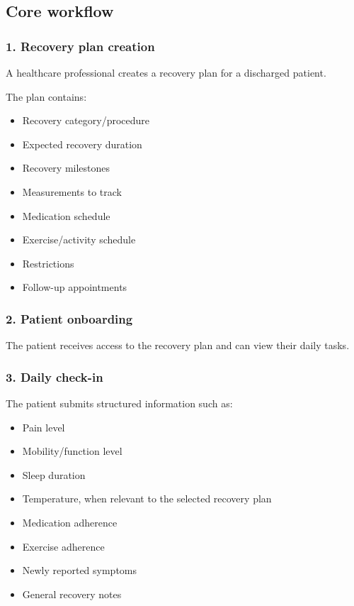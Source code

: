 \documentclass[11pt,a4paper]{article}
\begin{document}
\subsection{Core workflow}

\subsubsection{1. Recovery plan creation}

A healthcare professional creates a recovery plan for a
discharged patient.

The plan contains:
\begin{itemize}[leftmargin=0.7cm]
    \item Recovery category/procedure
    \item Expected recovery duration
    \item Recovery milestones
    \item Measurements to track
    \item Medication schedule
    \item Exercise/activity schedule
    \item Restrictions
    \item Follow-up appointments
\end{itemize}

\subsubsection{2. Patient onboarding}

The patient receives access to the recovery plan and can view
their daily tasks.

\subsubsection{3. Daily check-in}

The patient submits structured information such as:
\begin{itemize}[leftmargin=0.7cm]
    \item Pain level
    \item Mobility/function level
    \item Sleep duration
    \item Temperature, when relevant to the selected recovery plan
    \item Medication adherence
    \item Exercise adherence
    \item Newly reported symptoms
    \item General recovery notes
\end{itemize}
\end{document}
